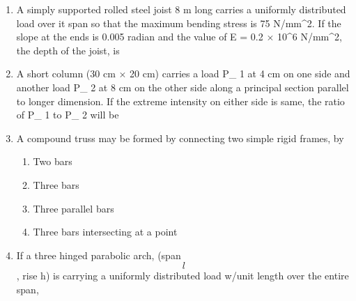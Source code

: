 \documentclass[11pt,a4paper]{article}
\begin{document}
\begin{enumerate}
\\
\item{A simply supported rolled steel joist 8 m long carries a uniformly distributed load over it span so that the maximum bending stress is 75 N/mm\^{}2. If the slope at the ends is 0.005 radian and the value of E = 0.2 $\times$ 10\^{}6 N/mm\^{}2, the depth of the joist, is
}
\\\begin{enumerate*}[itemjoin=\qquad, label=\Alph*.]
\item{200 mm}
\item{250 mm}
\item{300 mm}
\item{400 mm}
\end{enumerate*}
\item{A short column (30 cm $\times$ 20 cm) carries a load P\_ 1 at 4 cm on one side and another load P\_ 2 at 8 cm on the other side along a principal section parallel to longer dimension. If the extreme intensity on either side is same, the ratio of P\_ 1 to P\_ 2 will be
}
\\
\item{A compound truss may be formed by connecting two simple rigid frames, by}
\begin{enumerate}[label=\Alph*.]
\item{Two bars}
\item{Three bars}
\item{Three parallel bars}
\item{Three bars intersecting at a point}
\end{enumerate}
\item{If a three hinged parabolic arch, (span $$l$$, rise h) is carrying a uniformly distributed load w/unit length over the entire span,}

\end{enumerate}
\end{document}
